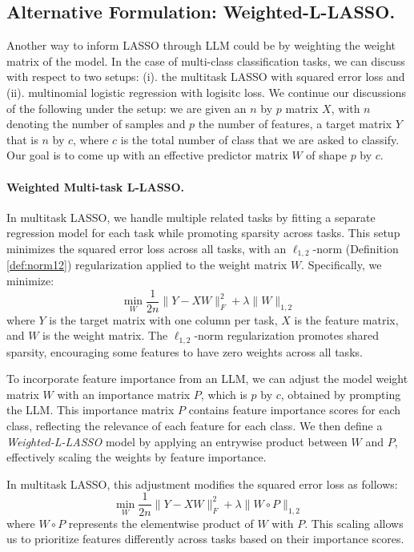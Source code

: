 \subsection{Alternative Formulation: Weighted-L-LASSO.} Another way to inform LASSO through LLM could be by weighting the weight matrix of the model. In the case of multi-class classification tasks, we can discuss with respect to two setups: (i). the multitask LASSO with squared error loss and (ii). multinomial logistic regression with logisitc loss. We continue our discussions of the following under the setup: we are given an $n$ by $p$ matrix $X$, with $n$ denoting the number of samples and $p$ the number of features, a target matrix $Y$ that is $n$ by $c$, where $c$ is the total number of class that we are asked to classify. Our goal is to come up with an effective predictor matrix $W$ of shape $p$ by $c$. 

\paragraph{Weighted Multi-task L-LASSO.} In multitask LASSO, we handle multiple related tasks by fitting a separate regression model for each task while promoting sparsity across tasks. This setup minimizes the squared error loss across all tasks, with an \( \ell_{1,2} \)-norm (Definition \ref{def:norm12}) regularization applied to the weight matrix \( W \). Specifically, we minimize:
     \[
     \min_{W} \frac{1}{2n} \| Y - X W \|_F^2 + \lambda \| W \|_{1,2}
     \]
     where \( Y \) is the target matrix with one column per task, \( X \) is the feature matrix, and \( W \) is the weight matrix. The \( \ell_{1,2} \)-norm regularization promotes shared sparsity, encouraging some features to have zero weights across all tasks.

     To incorporate feature importance from an LLM, we can adjust the model weight matrix \( W \) with an importance matrix \( P \), which is $p$ by $c$, obtained by prompting the LLM. This importance matrix \( P \) contains feature importance scores for each class, reflecting the relevance of each feature for each class. We then define a \textit{Weighted-L-LASSO} model by applying an entrywise product between \( W \) and \( P \), effectively scaling the weights by feature importance.

     In multitask LASSO, this adjustment modifies the squared error loss as follows:
     \[
     \min_{W} \frac{1}{2n} \| Y - XW \|_F^2 + \lambda \| W \circ P \|_{1,2}
     \]
     where \( W \circ P \) represents the elementwise product of \( W \) with \( P \). This scaling allows us to prioritize features differently across tasks based on their importance scores.
     
